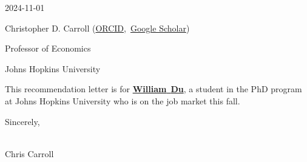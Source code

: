 \documentclass{econtex} %
\newcommand{\firstname}{William}
\newcommand{\lastname}{Du}
\begin{document}

\begin{flushright}
2024-11-01
\end{flushright}

\vspace*{-1mm}
\noindent Christopher D. Carroll (\href{https://orcid.org/0000-0003-3732-9312}{ORCID},~\href{https://scholar.google.com/citations?user=JY7jfgsAAAAJ}{Google Scholar})

\noindent Professor of Economics

\noindent Johns Hopkins University

\oddsidemargin 0in \textwidth 6.4in \topmargin 0in \textheight 8.8in
\pagestyle{empty}
\noindent
\small


\medskip\medskip
This recommendation letter is for \href{https://www.william-du.com}{\textbf{\firstname}~\textbf{\lastname}}, a student in the PhD program at Johns Hopkins University who is on the job market this fall.







%




\medskip\medskip\medskip

\noindent Sincerely,

\phantom{.}\\ 

\noindent Chris Carroll


\pagebreak
%
\end{document}
